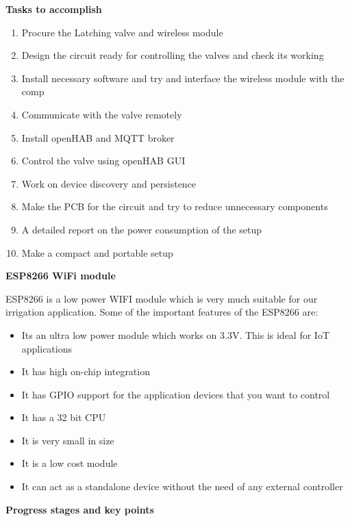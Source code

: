 \documentclass[16pt]{article}
\begin{document}
\hfill

{\Large{\textbf{Tasks to accomplish}}}

\begin{enumerate}

\item
  Procure the Latching valve and wireless module
\item
  Design the circuit ready for controlling the valves and check its
  working
\item
  Install necessary software and try and interface the wireless module
  with the comp
\item
  Communicate with the valve remotely
\item
  Install openHAB and MQTT broker
\item
  Control the valve using openHAB GUI
\item
  Work on device discovery and persistence
\item
  Make the PCB for the circuit and try to reduce unnecessary components
\item
  A detailed report on the power consumption of the setup
\item
  Make a compact and portable setup
\end{enumerate}


\vspace{16cm}
{\LARGE{\textbf{ESP8266 WiFi module}}}

ESP8266 is a low power WIFI module which is very much suitable for our
irrigation application. Some of the important features of the ESP8266
are:

\begin{itemize}

\item
  Its an ultra low power module which works on 3.3V. This is ideal for
  IoT applications
\item
  It has high on-chip integration
\item
  It has GPIO support for the application devices that you want to
  control
\item
  It has a 32 bit CPU
\item
  It is very small in size
\item
  It is a low cost module
\item
  It can act as a standalone device without the need of any external
  controller
\end{itemize}

{\Large{\textbf{Progress stages and key points}}}
\end{document}
